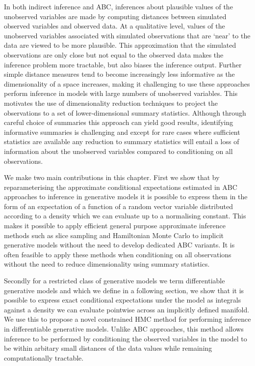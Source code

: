 
In both indirect inference and \ac{ABC}, inferences about plausible values of the unobserved variables are made by computing distances between simulated observed variables and observed data. At a qualitative level, values of the unobserved variables associated with simulated observations that are `near' to the data are viewed to be more plausible. This approximation that the simulated observations are only close but not equal to the observed data makes the inference problem more tractable, but also biases the inference output. Further simple distance measures tend to become increasingly less informative as the dimensionality of a space increases, making it challenging to use these approaches perform inference in models with large numbers of unobserved variables. This motivates the use of dimensionality reduction techniques to project the observations to a set of lower-dimensional summary statistics. Although through careful choice of summaries this approach can yield good results, identifying informative summaries is challenging and except for rare cases where sufficient statistics are available any reduction to summary statistics will entail a loss of information about the unobserved variables compared to conditioning on all observations.

We make two main contributions in this chapter. First we show that by reparameterising the approximate conditional expectations estimated in \ac{ABC} approaches to inference in generative models it is possible to express them in the form of an expectation of a function of a random vector variable distributed according to a density which we can evaluate up to a normalising constant. This makes it possible to apply efficient general purpose approximate inference methods such as slice sampling and Hamiltonian Monte Carlo to implicit generative models without the need to develop dedicated \ac{ABC} variants. It is often feasible to apply these methods when conditioning on all observations without the need to reduce dimensionality using summary statistics.

Secondly for a restricted class of generative models we term differentiable generative models and which we define in a following section, we show that it is possible to express exact conditional expectations under the model as integrals against a density we can evaluate pointwise across an implicitly defined manifold. We use this to propose a novel constrained \ac{HMC} method for performing inference in differentiable generative models. Unlike \ac{ABC} approaches, this method allows inference to be performed by conditioning the observed variables in the model to be within arbitary small distances of the data values while remaining computationally tractable.

